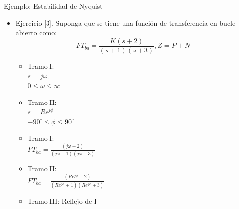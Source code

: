 \documentclass{beamer}
\begin{document}
\begin{frame}{Ejemplo: Estabilidad de Nyquist}
\begin{justify}
\begin{itemize}
 \item Ejercicio [3]. Suponga que se tiene una función de transferencia en bucle abierto como:
 \begin{equation} \label{margeng1}
    FT_{ba}=\frac{K(s+2)}{(s+1)(s+3)},  Z=P+N, 
  \end{equation}
\begin{multicols}{2}
\begin{itemize}
    \\
    \item Tramo I:
    \\
    $s=j\omega$,
    \\
    $0\leq\omega\leq\infty$  
    \\  
    \item Tramo II:
    \\
    $s=Re^{j\phi}$
    \\
     $-90^\circ\leq\phi\leq90^\circ$     
    \\
    
\end{itemize}
\begin{itemize}
     \item Tramo I:
     \\
     $FT_{ba}=\frac{(j\omega+2)}{(j\omega+1)(j\omega+3)}$
     \\
     \item Tramo II:
     \\
     $FT_{ba}=\frac{(Re^{j\phi}+2)}{(Re^{j\phi}+1)(Re^{j\phi}+3)}$
    \\
    \item Tramo III:
    Reflejo de I
\end{itemize}
\end{multicols}
\end{itemize}
\end{justify}
\end{frame}
\end{document}
